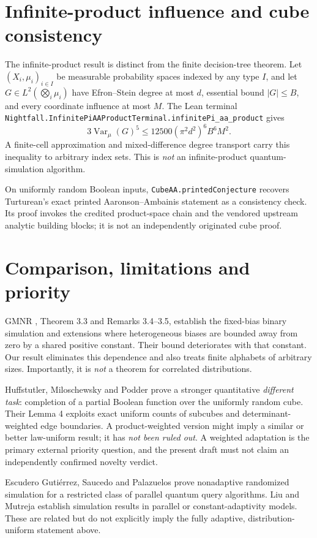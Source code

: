 \documentclass[11pt]{article}
\newcommand{\Var}{\operatorname{Var}}
\begin{document}
\section{Infinite-product influence and cube consistency}
The infinite-product result is distinct from the finite decision-tree theorem. Let $(X_i,\mu_i)_{i\in I}$ be measurable probability spaces indexed by any type $I$, and let $G\in L^2(\bigotimes_i\mu_i)$ have Efron--Stein degree at most $d$, essential bound $|G|\le B$, and every coordinate influence at most $M$. The Lean terminal
\texttt{Nightfall.InfinitePiAAProductTerminal.infinitePi\_aa\_product}
gives
\[
3\Var_\mu(G)^5\le12500(\pi^2d^2)^6B^6M^2.
\]
A finite-cell approximation and mixed-difference degree transport carry this inequality to arbitrary index sets. This is \emph{not} an infinite-product quantum-simulation algorithm.

On uniformly random Boolean inputs, \texttt{CubeAA.printedConjecture} recovers Turturean's exact printed Aaronson--Ambainis statement as a consistency check. Its proof invokes the credited product-space chain and the vendored upstream analytic building blocks; it is not an independently originated cube proof.

\section{Comparison, limitations and priority}
GMNR \cite{GMNR26}, Theorem 3.3 and Remarks 3.4--3.5, establish the fixed-bias binary simulation and extensions where heterogeneous biases are bounded away from zero by a shared positive constant. Their bound deteriorates with that constant. Our result eliminates this dependence and also treats finite alphabets of arbitrary sizes. Importantly, it is \emph{not} a theorem for correlated distributions.

Huffstutler, Miloschewsky and Podder \cite{HMP26} prove a stronger quantitative \emph{different task}: completion of a partial Boolean function over the uniformly random cube. Their Lemma 4 exploits exact uniform counts of subcubes and determinant-weighted edge boundaries. A product-weighted version might imply a similar or better law-uniform result; it has \emph{not been ruled out}. A weighted adaptation is the primary external priority question, and the present draft must not claim an independently confirmed novelty verdict.

Escudero Guti\'errez, Saucedo and Palazuelos \cite{ESP26} prove nonadaptive randomized simulation for a restricted class of parallel quantum query algorithms. Liu and Mutreja \cite{LM26} establish simulation results in parallel or constant-adaptivity models. These are related but do not explicitly imply the fully adaptive, distribution-uniform statement above.
\end{document}
